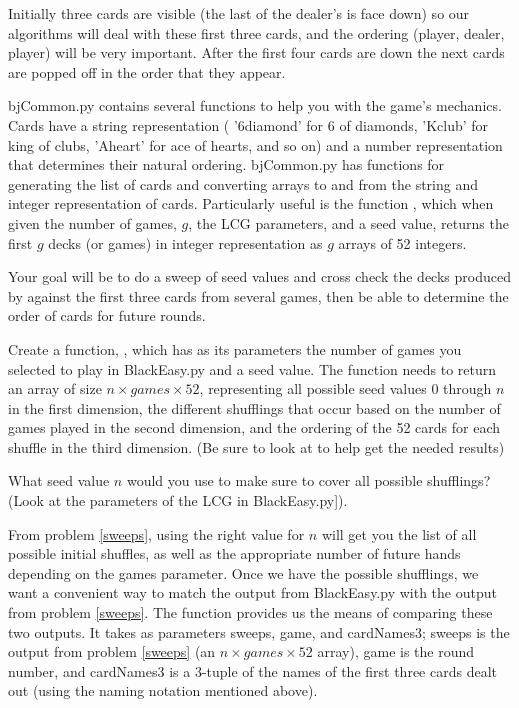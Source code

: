 Initially three cards are visible (the last of the dealer's is face down) so our algorithms will deal with these first three cards, and the ordering (player, dealer, player) will be very important. 
After the first four cards are down the next cards are popped off in the order that they appear. 

bjCommon.py contains several functions to help you with the game's mechanics.
Cards have a string representation ( '6diamond' for 6 of diamonds, 'Kclub' for king of clubs, 'Aheart' for ace of hearts, and so on) and a number representation that determines their natural ordering. 
bjCommon.py has functions for generating the list of cards and converting arrays to and from the string and integer representation of cards. 
Particularly useful is the function , which when given the number of games, $g$, the LCG parameters, and a seed value, returns the first $g$ decks (or games) in integer representation as $g$ arrays of 52 integers.

Your goal will be to do a sweep of seed values and cross check the decks produced by  against the first three cards from several games, then be able to determine the order of cards for future rounds.


\begin{problem}\label{sweeps}

Create a function, , which has as its parameters the number of games you selected to play in BlackEasy.py and a seed value.
The function needs to return an array of size $n\times games \times 52$, representing all possible seed values 0 through $n$ in the first dimension, the different shufflings that occur based on the number of games played in the second dimension, and the ordering of the 52 cards for each shuffle in the third dimension.
(Be sure to look at  to help get the needed results)

What seed value $n$ would you use to make sure to cover all possible shufflings?
(Look at the parameters of the LCG in BlackEasy.py]).

\end{problem}

From problem \ref{sweeps}, using the right value for $n$ will get you the list of all possible initial shuffles, as well as the appropriate number of future hands depending on the games parameter.
Once we have the possible shufflings, we want a convenient way to match the output from BlackEasy.py with the output from problem \ref{sweeps}.
The function  provides us the means of comparing these two outputs.
It takes as parameters sweeps, game, and cardNames3; sweeps is the output from problem \ref{sweeps} (an $n \times games \times 52$ array), game is the round number, and cardNames3 is a 3-tuple of the names of the first three cards dealt out (using the naming notation mentioned above).

